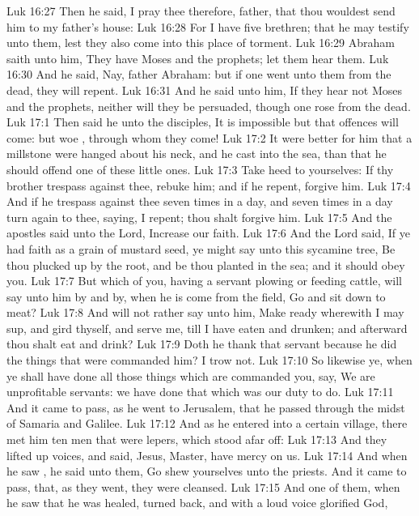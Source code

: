 \vs Luk 16:27 Then he said, I pray thee therefore, father, that thou wouldest send him to my father's house:
\vs Luk 16:28 For I have five brethren; that he may testify unto them, lest they also come into this place of torment.
\vs Luk 16:29 Abraham saith unto him, They have Moses and the prophets; let them hear them.
\vs Luk 16:30 And he said, Nay, father Abraham: but if one went unto them from the dead, they will repent.
\vs Luk 16:31 And he said unto him, If they hear not Moses and the prophets, neither will they be persuaded, though one rose from the dead.
\vs Luk 17:1 Then said he unto the disciples, It is impossible but that offences will come: but woe , through whom they come!
\vs Luk 17:2 It were better for him that a millstone were hanged about his neck, and he cast into the sea, than that he should offend one of these little ones.
\vs Luk 17:3 Take heed to yourselves: If thy brother trespass against thee, rebuke him; and if he repent, forgive him.
\vs Luk 17:4 And if he trespass against thee seven times in a day, and seven times in a day turn again to thee, saying, I repent; thou shalt forgive him.
\vs Luk 17:5 And the apostles said unto the Lord, Increase our faith.
\vs Luk 17:6 And the Lord said, If ye had faith as a grain of mustard seed, ye might say unto this sycamine tree, Be thou plucked up by the root, and be thou planted in the sea; and it should obey you.
\vs Luk 17:7 But which of you, having a servant plowing or feeding cattle, will say unto him by and by, when he is come from the field, Go and sit down to meat?
\vs Luk 17:8 And will not rather say unto him, Make ready wherewith I may sup, and gird thyself, and serve me, till I have eaten and drunken; and afterward thou shalt eat and drink?
\vs Luk 17:9 Doth he thank that servant because he did the things that were commanded him? I trow not.
\vs Luk 17:10 So likewise ye, when ye shall have done all those things which are commanded you, say, We are unprofitable servants: we have done that which was our duty to do.
\vs Luk 17:11 And it came to pass, as he went to Jerusalem, that he passed through the midst of Samaria and Galilee.
\vs Luk 17:12 And as he entered into a certain village, there met him ten men that were lepers, which stood afar off:
\vs Luk 17:13 And they lifted up  voices, and said, Jesus, Master, have mercy on us.
\vs Luk 17:14 And when he saw , he said unto them, Go shew yourselves unto the priests. And it came to pass, that, as they went, they were cleansed.
\vs Luk 17:15 And one of them, when he saw that he was healed, turned back, and with a loud voice glorified God,

